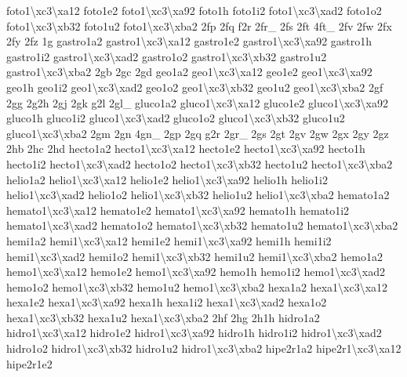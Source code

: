 {foto1\textbackslash{}xc3\textbackslash{}xa12 foto1e2 foto1\textbackslash{}xc3\textbackslash{}xa92 foto1h foto1i2 foto1\textbackslash{}xc3\textbackslash{}xad2 foto1o2 foto1\textbackslash{}xc3\textbackslash{}xb32 foto1u2 foto1\textbackslash{}xc3\textbackslash{}xba2 2fp 2fq f2r 2fr\-\_\- 2fs 2ft 4ft\-\_\- 2fv 2fw 2fx 2fy 2fz 1g gastro1a2 gastro1\textbackslash{}xc3\textbackslash{}xa12 gastro1e2 gastro1\textbackslash{}xc3\textbackslash{}xa92 gastro1h gastro1i2 gastro1\textbackslash{}xc3\textbackslash{}xad2 gastro1o2 gastro1\textbackslash{}xc3\textbackslash{}xb32 gastro1u2 gastro1\textbackslash{}xc3\textbackslash{}xba2 2gb 2gc 2gd geo1a2 geo1\textbackslash{}xc3\textbackslash{}xa12 geo1e2 geo1\textbackslash{}xc3\textbackslash{}xa92 geo1h geo1i2 geo1\textbackslash{}xc3\textbackslash{}xad2 geo1o2 geo1\textbackslash{}xc3\textbackslash{}xb32 geo1u2 geo1\textbackslash{}xc3\textbackslash{}xba2 2gf 2gg 2g2h 2gj 2gk g2l 2gl\-\_\- gluco1a2 gluco1\textbackslash{}xc3\textbackslash{}xa12 gluco1e2 gluco1\textbackslash{}xc3\textbackslash{}xa92 gluco1h gluco1i2 gluco1\textbackslash{}xc3\textbackslash{}xad2 gluco1o2 gluco1\textbackslash{}xc3\textbackslash{}xb32 gluco1u2 gluco1\textbackslash{}xc3\textbackslash{}xba2 2gm 2gn 4gn\-\_\- 2gp 2gq g2r 2gr\-\_\- 2gs 2gt 2gv 2gw 2gx 2gy 2gz 2hb 2hc 2hd hecto1a2 hecto1\textbackslash{}xc3\textbackslash{}xa12 hecto1e2 hecto1\textbackslash{}xc3\textbackslash{}xa92 hecto1h hecto1i2 hecto1\textbackslash{}xc3\textbackslash{}xad2 hecto1o2 hecto1\textbackslash{}xc3\textbackslash{}xb32 hecto1u2 hecto1\textbackslash{}xc3\textbackslash{}xba2 helio1a2 helio1\textbackslash{}xc3\textbackslash{}xa12 helio1e2 helio1\textbackslash{}xc3\textbackslash{}xa92 helio1h helio1i2 helio1\textbackslash{}xc3\textbackslash{}xad2 helio1o2 helio1\textbackslash{}xc3\textbackslash{}xb32 helio1u2 helio1\textbackslash{}xc3\textbackslash{}xba2 hemato1a2 hemato1\textbackslash{}xc3\textbackslash{}xa12 hemato1e2 hemato1\textbackslash{}xc3\textbackslash{}xa92 hemato1h hemato1i2 hemato1\textbackslash{}xc3\textbackslash{}xad2 hemato1o2 hemato1\textbackslash{}xc3\textbackslash{}xb32 hemato1u2 hemato1\textbackslash{}xc3\textbackslash{}xba2 hemi1a2 hemi1\textbackslash{}xc3\textbackslash{}xa12 hemi1e2 hemi1\textbackslash{}xc3\textbackslash{}xa92 hemi1h hemi1i2 hemi1\textbackslash{}xc3\textbackslash{}xad2 hemi1o2 hemi1\textbackslash{}xc3\textbackslash{}xb32 hemi1u2 hemi1\textbackslash{}xc3\textbackslash{}xba2 hemo1a2 hemo1\textbackslash{}xc3\textbackslash{}xa12 hemo1e2 hemo1\textbackslash{}xc3\textbackslash{}xa92 hemo1h hemo1i2 hemo1\textbackslash{}xc3\textbackslash{}xad2 hemo1o2 hemo1\textbackslash{}xc3\textbackslash{}xb32 hemo1u2 hemo1\textbackslash{}xc3\textbackslash{}xba2 hexa1a2 hexa1\textbackslash{}xc3\textbackslash{}xa12 hexa1e2 hexa1\textbackslash{}xc3\textbackslash{}xa92 hexa1h hexa1i2 hexa1\textbackslash{}xc3\textbackslash{}xad2 hexa1o2 hexa1\textbackslash{}xc3\textbackslash{}xb32 hexa1u2 hexa1\textbackslash{}xc3\textbackslash{}xba2 2hf 2hg 2h1h hidro1a2 hidro1\textbackslash{}xc3\textbackslash{}xa12 hidro1e2 hidro1\textbackslash{}xc3\textbackslash{}xa92 hidro1h hidro1i2 hidro1\textbackslash{}xc3\textbackslash{}xad2 hidro1o2 hidro1\textbackslash{}xc3\textbackslash{}xb32 hidro1u2 hidro1\textbackslash{}xc3\textbackslash{}xba2 hipe2r1a2 hipe2r1\textbackslash{}xc3\textbackslash{}xa12 hipe2r1e2 }
